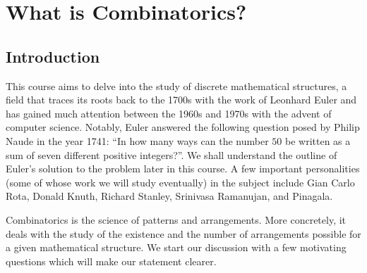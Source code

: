\chapter{What is Combinatorics?}
\section{Introduction}
This course aims to delve into the study of discrete mathematical structures, a field that traces its roots back to the 1700s with the work of Leonhard Euler and has gained much attention between the 1960s and 1970s with the advent of computer science. Notably, Euler answered the following question posed by Philip Naude in the year 1741: “In how many ways can the number $50$ be written as a sum of seven different positive integers?”. We shall understand the outline of Euler’s solution to the problem later in this course. A few important personalities (some of whose work we will study eventually) in the subject include Gian Carlo Rota, Donald Knuth, Richard Stanley, Srinivasa Ramanujan, and Pinagala. 

Combinatorics is the science of patterns and arrangements. More concretely, it deals with the study of the existence and the number of arrangements possible for a given mathematical structure. We start our discussion with a few motivating questions which will make our statement clearer.

